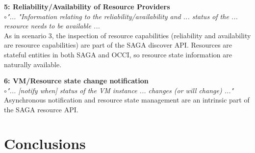 \documentclass[10pt,conference,final,letterpaper,twoside,twocolumn,]{IEEEtran}
\newcommand{\I}[1]{\textit{#1}}
\newcommand{\B}[1]{\textbf{#1}}
\newcommand{\F}[1]{\B{[FIXME: #1]}}
\newcommand{\bull}{$\circ$}
\begin{document}
  \noindent
  \B{5: Reliability/Availability of Resource Providers}\\
  \bull \I{"... "Information relating to the reliability/availability 
  and ... status of the ... resource needs to be available ...}\\
  As in scenario 3, the inspection of resource capabilities
  (reliability and availability are resource capabilities) are part of
  the SAGA discover API.  Resources are stateful entities in both SAGA
  and OCCI, so resource state information are naturally available.

  \noindent
  \B{6: VM/Resource state change notification}\\
  \bull \I{"... [notify when] status of the VM instance ...
  changes (or will change) ..."}\\ 
  Asynchronous notification and resource state management are an
  intrinsic part of the SAGA resource API.




\section{Conclusions}







\end{document}
